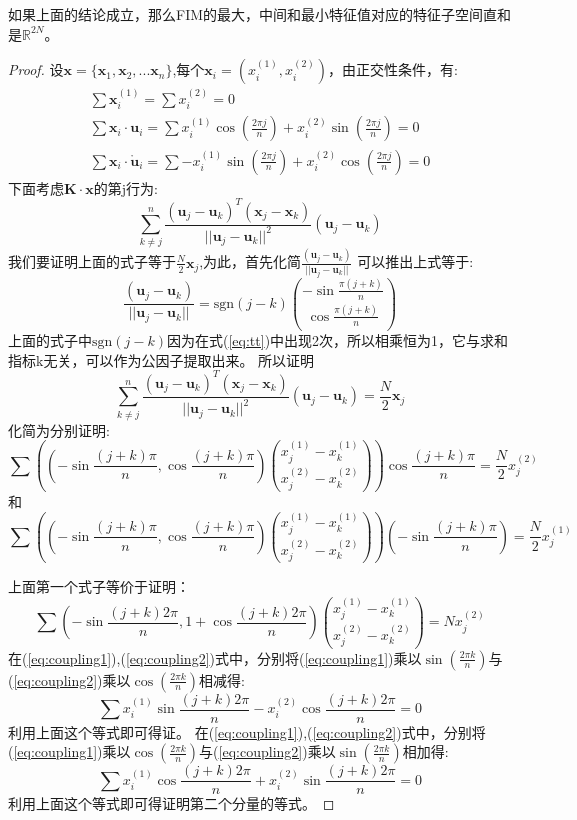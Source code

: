 \documentclass[12pt]{article}
\theoremstyle{remark}
\begin{document}
如果上面的结论成立，那么FIM的最大，中间和最小特征值对应的特征子空间直和是$\mathbb{R}^{2N}$。
\begin{proof}
设$\bm{x}=\{\bm{x}_1,\bm{x}_2,...\bm{x}_n\}$,每个$\bm{x}_i=(x_i^{(1)},x_i^{(2)})$，由正交性条件，有:
\begin{eqnarray}
\sum \bm{x}_i^{(1)}=\sum x_i^{(2)}=0\\
\sum \bm{x}_i \cdot \bm{u}_i=\sum x_i^{(1)} \cos(\frac{2\pi j}{n})+x_i^{(2)} \sin(\frac{2\pi j}{n}) =0\label{eq:coupling1}\\
\sum \bm{x}_i \cdot \mathring{\bm{u}}_i=\sum -x_i^{(1)} \sin(\frac{2\pi j}{n})+x_i^{(2)} \cos(\frac{2\pi j}{n}) =0\label{eq:coupling2}
\end{eqnarray}
下面考虑$\bm{K}\cdot \bm{x}$的第j行为:
\begin{equation}\label{eq:tt}
\sum_{k\neq j}^n \frac{(\bm{u}_j-\bm{u}_k)^T(\bm{x}_j-\bm{x}_k)}{||\bm{u}_j-\bm{u}_k||^2}(\bm{u}_j-\bm{u}_k)
\end{equation}
我们要证明上面的式子等于$\frac{N}{2}\bm{x}_j$,为此，首先化简$\frac{(\bm{u}_j-\bm{u}_k)}{||\bm{u}_j-\bm{u}_k||}$
可以推出上式等于:
\begin{equation}
\frac{(\bm{u}_j-\bm{u}_k)}{||\bm{u}_j-\bm{u}_k||}=\text{sgn}(j-k)\binom{-\sin\frac{\pi(j+k)}{n}}{\cos\frac{\pi(j+k)}{n}}
\end{equation}
上面的式子中$\text{sgn}(j-k)$因为在式(\ref{eq:tt})中出现2次，所以相乘恒为1，它与求和指标k无关，可以作为公因子提取出来。
所以证明
\[
\sum_{k\neq j}^n \frac{(\bm{u}_j-\bm{u}_k)^T(\bm{x}_j-\bm{x}_k)}{||\bm{u}_j-\bm{u}_k||^2}(\bm{u}_j-\bm{u}_k)=\frac{N}{2}\bm{x}_j
\]
化简为分别证明:
\[
\sum ((-\sin\frac{(j+k)\pi}{n},\cos\frac{(j+k)\pi}{n})\binom{x_j^{(1)}-x_k^{(1)}}{x_j^{(2)}-x_k^{(2)}})
\cos\frac{(j+k)\pi}{n}=\frac{N}{2}x_j^{(2)}
\]
和
\[
\sum ((-\sin\frac{(j+k)\pi}{n},\cos\frac{(j+k)\pi}{n})\binom{x_j^{(1)}-x_k^{(1)}}{x_j^{(2)}-x_k^{(2)}})
(-\sin\frac{(j+k)\pi}{n})=\frac{N}{2}x_j^{(1)}
\]

上面第一个式子等价于证明：
\[
\sum (-\sin\frac{(j+k)2\pi}{n},1+\cos\frac{(j+k)2\pi}{n})\binom{x_j^{(1)}-x_k^{(1)}}{x_j^{(2)}-x_k^{(2)}}=Nx_j^{(2)}
\]
在(\ref{eq:coupling1}),(\ref{eq:coupling2})式中，分别将(\ref{eq:coupling1})乘以$\sin(\frac{2\pi k}{n})$与(\ref{eq:coupling2})乘以$\cos(\frac{2\pi k}{n})$相减得:
\begin{equation}
\sum x_i^{(1)}\sin\frac{(j+k)2\pi}{n}-x_i^{(2)}\cos\frac{(j+k)2\pi}{n}=0
\end{equation}
利用上面这个等式即可得证。
在(\ref{eq:coupling1}),(\ref{eq:coupling2})式中，分别将(\ref{eq:coupling1})乘以$\cos(\frac{2\pi k}{n})$与(\ref{eq:coupling2})乘以$\sin(\frac{2\pi k}{n})$相加得:
\begin{equation}
\sum x_i^{(1)}\cos\frac{(j+k)2\pi}{n}+x_i^{(2)}\sin\frac{(j+k)2\pi}{n}=0
\end{equation}
利用上面这个等式即可得证明第二个分量的等式。

\end{proof}
\end{document}
